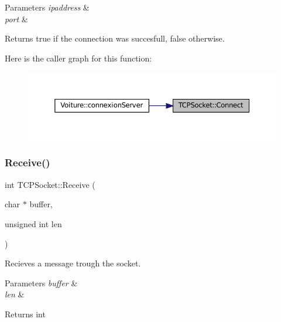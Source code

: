 \begin{DoxyParams}{Parameters}
{\em ipaddress} & \\
\hline
{\em port} & \\
\hline
\end{DoxyParams}
\begin{DoxyReturn}{Returns}
true if the connection was succesfull, false otherwise. 
\end{DoxyReturn}
Here is the caller graph for this function\+:
\nopagebreak
\begin{figure}[H]
\begin{center}
\leavevmode
\includegraphics[width=350pt]{class_t_c_p_socket_ac816c30175550d8d9a14c89c1c5ec8da_icgraph}
\end{center}
\end{figure}
\mbox{\label{class_t_c_p_socket_a8341c9364e71e992aa61534dbf88a2a2}} 
\subsubsection{\texorpdfstring{Receive()}{Receive()}}
{\footnotesize\ttfamily int T\+C\+P\+Socket\+::\+Receive (\begin{DoxyParamCaption}\item[{char $\ast$}]{buffer,  }\item[{unsigned int}]{len }\end{DoxyParamCaption})}



Recieves a message trough the socket. 


\begin{DoxyParams}{Parameters}
{\em buffer} & \\
\hline
{\em len} & \\
\hline
\end{DoxyParams}
\begin{DoxyReturn}{Returns}
int 
\end{DoxyReturn}
\mbox{\label{class_t_c_p_socket_acc5345a54a874aafb3389489f2c1c846}} 

